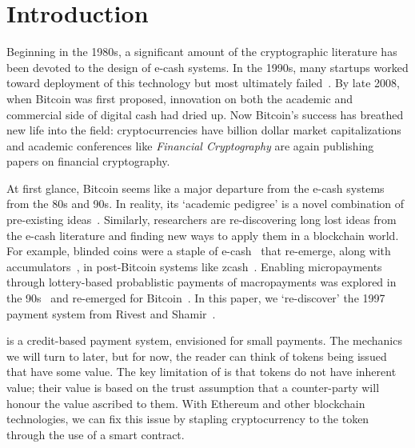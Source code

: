 

\section{Introduction}

Beginning in the 1980s, a significant amount of the cryptographic literature has been devoted to the design of e-cash systems. In the 1990s, many startups worked toward deployment of this technology but most ultimately failed~\cite{NBFMG16}. By late 2008, when Bitcoin was first proposed, innovation on both the academic and commercial side of digital cash had dried up. Now Bitcoin's success has breathed new life into the field: cryptocurrencies have billion dollar market capitalizations and academic conferences like \textit{Financial Cryptography} are again publishing papers on financial cryptography. 

At first glance, Bitcoin seems like a major departure from the e-cash systems from the 80s and 90s. In reality, its `academic pedigree' is a novel combination of pre-existing ideas~\cite{NaCl17}. Similarly, researchers are re-discovering long lost ideas from the e-cash literature and finding new ways to apply them in a blockchain world. For example, blinded coins were a staple of e-cash~\cite{Cha82} that re-emerge, along with accumulators~\cite{SaTa99}, in post-Bitcoin systems like zcash~\cite{MGGR13,SCG+14}. Enabling micropayments through lottery-based probablistic payments of macropayments was explored in the 90s~\cite{Riv97,Whe97,JaOd97} and re-emerged for Bitcoin~\cite{Pash15}. In this paper, we `re-discover' the 1997 payment system \pw from Rivest and Shamir~\cite{RS96}. 

\pw is a credit-based payment system, envisioned for small payments. The mechanics we will turn to later, but for now, the reader can think of tokens being issued that have some value. The key limitation of \pw is that tokens do not have inherent value; their value is based on the trust assumption that a counter-party will honour the value ascribed to them. With Ethereum and other blockchain technologies, we can fix this issue by stapling cryptocurrency to the token through the use of a smart contract. 

